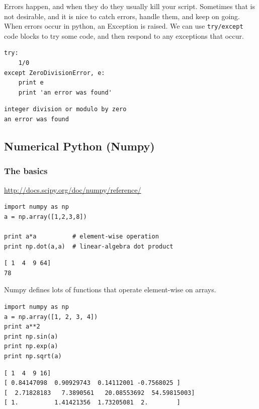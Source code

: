 \documentclass[11pt]{article}
\begin{document}
Errors happen, and when they do they usually kill your script. Sometimes that is not desirable, and it is nice to catch errors, handle them, and keep on going. When errors occur in python, an Exception is raised. We can use \texttt{try/except} code blocks to try some code, and then respond to any exceptions that occur.

\begin{verbatim}
try:
    1/0
except ZeroDivisionError, e:
    print e
    print 'an error was found'
\end{verbatim}

\begin{verbatim}
integer division or modulo by zero
an error was found
\end{verbatim}


\subsection{Numerical Python (Numpy)}
\label{sec-3-11}

\subsubsection{The basics}
\label{sec-3-11-1}
\url{http://docs.scipy.org/doc/numpy/reference/}

\begin{verbatim}
import numpy as np
a = np.array([1,2,3,8])

print a*a          # element-wise operation
print np.dot(a,a)  # linear-algebra dot product
\end{verbatim}

\begin{verbatim}
[ 1  4  9 64]
78
\end{verbatim}

Numpy defines lots of functions that operate element-wise on arrays.

\begin{verbatim}
import numpy as np
a = np.array([1, 2, 3, 4])
print a**2
print np.sin(a)
print np.exp(a)
print np.sqrt(a)
\end{verbatim}

\begin{verbatim}
[ 1  4  9 16]
[ 0.84147098  0.90929743  0.14112001 -0.7568025 ]
[  2.71828183   7.3890561   20.08553692  54.59815003]
[ 1.          1.41421356  1.73205081  2.        ]
\end{verbatim}
\end{document}
